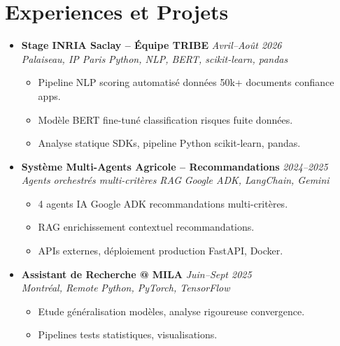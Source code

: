 \documentclass[a4paper,11pt]{article}
\begin{document}
\section{Experiences et Projets}
\begin{itemize}[leftmargin=0.5cm, nosep]

    \item \textbf{Stage INRIA Saclay -- \'Equipe TRIBE} \hfill \textit{Avril--Ao\^ut 2026} \\
    \textit{Palaiseau, IP Paris} \hfill \textit{Python, NLP, BERT, scikit-learn, pandas}
    \vspace{-2pt}
    \begin{itemize}[leftmargin=0.4cm, nosep, label=\tiny$\bullet$]
        \item \small{Pipeline NLP scoring automatisé donn\'ees 50k+ documents confiance apps.}
        \item \small{Mod\`ele BERT fine-tun\'e classification risques fuite donn\'ees.}
        \item \small{Analyse statique SDKs, pipeline Python scikit-learn, pandas.}
    \end{itemize}
    \vspace{3pt}

    \item \textbf{Syst\`eme Multi-Agents Agricole -- Recommandations} \hfill \textit{2024--2025} \\
    \textit{Agents orchestr\'es multi-crit\`eres RAG} \hfill \textit{Google ADK, LangChain, Gemini}
    \vspace{-2pt}
    \begin{itemize}[leftmargin=0.4cm, nosep, label=\tiny$\bullet$]
        \item \small{4 agents IA Google ADK recommandations multi-crit\`eres.}
        \item \small{RAG enrichissement contextuel recommandations.}
        \item \small{APIs externes, d\'eploiement production FastAPI, Docker.}
    \end{itemize}
    \vspace{3pt}

    \item \textbf{Assistant de Recherche @ MILA} \hfill \textit{Juin--Sept 2025} \\
    \textit{Montr\'eal, Remote} \hfill \textit{Python, PyTorch, TensorFlow}
    \vspace{-2pt}
    \begin{itemize}[leftmargin=0.4cm, nosep, label=\tiny$\bullet$]
        \item \small{Etude g\'en\'eralisation mod\`eles, analyse rigoureuse convergence.}
        \item \small{Pipelines tests statistiques, visualisations.}
    \end{itemize}
    \vspace{3pt}


\end{itemize}
\end{document}
